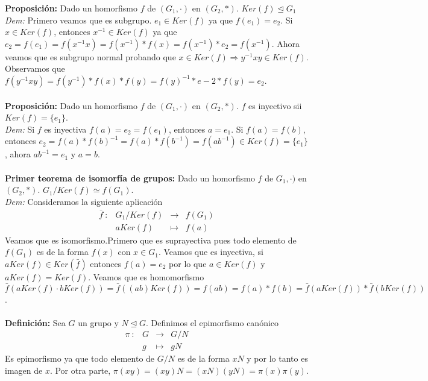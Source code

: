 \documentclass{article}
\begin{document}
\textbf{Proposición:} 
Dado un homorfismo $f$ de $(G_1,\cdot)$ en $(G_2,*)$. $Ker(f)\trianglelefteq G_1$\\
\textit{Dem:} Primero veamos que es subgrupo. $e_1\in Ker(f)$ ya que $f(e_1)=e_2$. Si $x\in Ker(f)$, entonces $x^{-1}\in Ker(f)$ ya que $e_2=f(e_1)=f(x^{-1} x)=f(x^{-1})*f(x)=f(x^{-1})*e_2=f(x^{-1})$. Ahora veamos que es subgrupo normal probando que $x\in Ker(f) \Rightarrow y^{-1}xy\in Ker(f)$. Observamos que $f(y^{-1}xy)=f(y^{-1})*f(x)*f(y)=f(y)^{-1}*e-2*f(y)=e_2$.\\\\


\textbf{Proposición:} Dado un homorfismo $f$ de $(G_1,\cdot)$ en $(G_2,*)$. $f$ es inyectivo sii $Ker(f)=\{e_1\}$.\\
\textit{Dem:} Si $f$ es inyectiva $f(a)=e_2=f(e_1)$, entonces $a=e_1$. Si $f(a)=f(b)$, entonces $e_2=f(a)*f(b)^{-1}=f(a)*f(b^{-1})=f(ab^{-1})\in Ker(f)=\{e_1\}$, ahora $ab^{-1}=e_1$ y $a=b$.\\\\


\textbf{Primer teorema de isomorfía de grupos:} Dado un homorfismo $f$ de $G_1,\cdot)$ en $(G_2,*)$. $G_1/Ker(f)\simeq f(G_1)$.\\
\textit{Dem:} Consideramos la siguiente aplicación
$$
\begin{array}{cccc}
    \bar{f}\::&G_1/Ker(f)&\longrightarrow&f(G_1)\\
        &aKer(f)&\longmapsto&f(a)
\end{array}
$$
Veamos que es isomorfismo.Primero que es suprayectiva pues todo elemento de $f(G_1)$ es de la forma $f(x)$ con $x\in G_1$. Veamos que es inyectiva, si $aKer(f)\in Ker(\bar{f})$ entonces $f(a)=e_2$ por lo que $a\in Ker(f)$ y $aKer(f)=Ker(f)$. Veamos que es homomorfismo $\bar{f}(aKer(f)\cdot bKer(f))=\bar{f}((ab)Ker(f))=f(ab)=f(a)*f(b)=\bar{f}(aKer(f))*\bar{f}(bKer(f))$.\\\\


\textbf{Definición:} Sea $G$ un grupo y $N\trianglelefteq G$. Definimos el epimorfismo canónico
$$
\begin{array}{cccc}
    \pi\::&G&\longrightarrow&G/N\\
        &g&\longmapsto&gN
\end{array}
$$
Es epimorfismo ya que todo elemento de $G/N$ es de la forma $xN$ y por lo tanto es imagen de $x$. Por otra parte, $\pi(xy)=(xy)N=(xN)(yN)=\pi(x)\pi(y)$.\\\\
\end{document}
